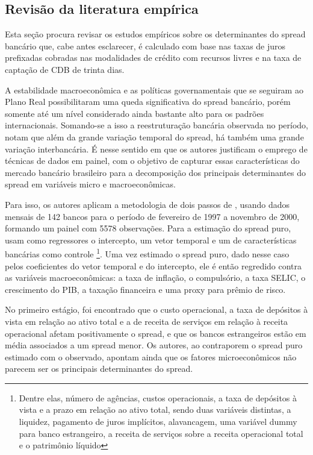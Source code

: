 \documentclass[a4paper, article, 12pt, openany, oneside, english, brazil]{abntex2}
\begin{document}
\subsection{Revisão da literatura empírica}

    Esta seção procura revisar os estudos empíricos sobre os determinantes do spread bancário que, cabe antes esclarecer, é calculado com base nas taxas de juros prefixadas cobradas nas modalidades de crédito com recursos livres e na taxa de captação de CDB de trinta dias.

    A estabilidade macroeconômica e as políticas governamentais que se seguiram ao Plano Real possibilitaram uma queda significativa do spread bancário, porém somente até um nível considerado ainda bastante alto para os padrões internacionais. Somando-se a isso a reestruturação bancária observada no período,  notam que além da grande variação temporal do spread, há também uma grande variação interbancária. É nesse sentido em que os autores justificam o emprego de técnicas de dados em painel, com o objetivo de capturar essas características do mercado bancário brasileiro para a decomposição dos principais determinantes do spread em variáveis micro e macroeconômicas.

    Para isso, os autores aplicam a metodologia de dois passos de , usando dados mensais de 142 bancos para o período de fevereiro de 1997 a novembro de 2000, formando um painel com 5578 observações. Para a estimação do spread puro, usam como regressores o intercepto, um vetor temporal e um de características bancárias como controle \footnote{Dentre elas, número de agências, custos operacionais, a taxa de depósitos à vista e a prazo em relação ao ativo total, sendo duas variáveis distintas, a liquidez, pagamento de juros implícitos, alavancagem, uma variável dummy para banco estrangeiro, a receita de serviços sobre a receita operacional total e o patrimônio líquido}. Uma vez estimado o spread puro, dado nesse caso pelos coeficientes do vetor temporal e do intercepto, ele é então regredido contra as variáveis macroeconômicas: a taxa de inflação, o compulsório, a taxa SELIC, o crescimento do PIB, a taxação financeira e uma proxy para prêmio de risco.

    No primeiro estágio, foi encontrado que o custo operacional, a taxa de depósitos à vista em relação ao ativo total e a de receita de serviços em relação à receita operacional afetam positivamente o spread, e que os bancos estrangeiros estão em média associados a um spread menor. Os autores, ao contraporem o spread puro estimado com o observado, apontam ainda que os fatores microeconômicos não parecem ser os principais determinantes do spread.
    
\end{document}
